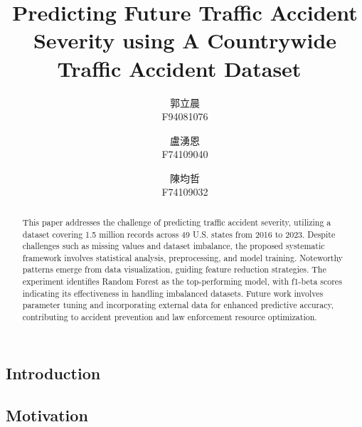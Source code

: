 \documentclass[10pt,twocolumn,letterpaper]{article}
\begin{document}
\begin{CJK}{UTF8}{bsmi}
\title{Predicting Future Traffic Accident Severity using A Countrywide Traffic Accident Dataset~\cite{2019arXiv190605409M}\cite{2019arXiv190909638M}}

\author{
郭立晨 \\
F94081076\\
\and
盧湧恩\\
F74109040\\
\and
陳均哲\\
F74109032\\
}
\maketitle

\begin{abstract}
This paper addresses the challenge of predicting traffic accident severity, utilizing a dataset covering 1.5 million records across 49 U.S. states from 2016 to 2023. Despite challenges such as missing values and dataset imbalance, the proposed systematic framework involves statistical analysis, preprocessing, and model training. Noteworthy patterns emerge from data visualization, guiding feature reduction strategies. The experiment identifies Random Forest as the top-performing model, with f1-beta scores indicating its effectiveness in handling imbalanced datasets. Future work involves parameter tuning and incorporating external data for enhanced predictive accuracy, contributing to accident prevention and law enforcement resource optimization.
\end{abstract}

\section{Introduction}
\label{sec:intro}


\subsection{Motivation}


\end{CJK}
\end{document}
